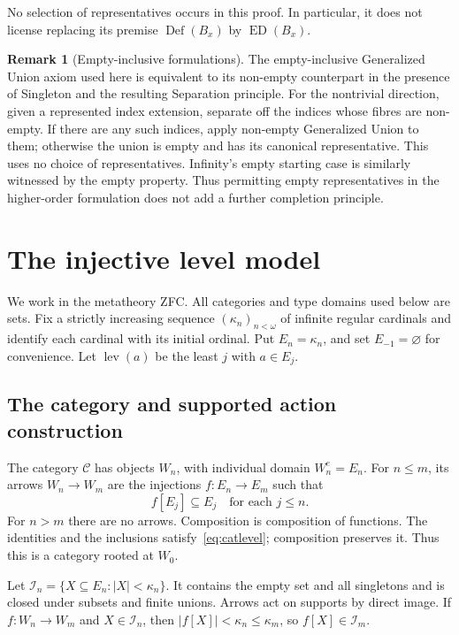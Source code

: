 \documentclass[11pt]{article}
\theoremstyle{definition}
\newtheorem{remark}[theorem]{Remark}
\newcommand{\ED}{\operatorname{ED}}
\newcommand{\Def}{\operatorname{Def}}
\newcommand{\lev}{\operatorname{lev}}
\numberwithin{equation}{section}
\begin{document}
No selection of representatives occurs in this proof. In particular, it does not license replacing its premise $\Def(B_x)$ by $\ED(B_x)$.

\begin{remark}[Empty-inclusive formulations]
The empty-inclusive Generalized Union axiom used here is equivalent to its non-empty counterpart in the presence of Singleton and the resulting Separation principle. For the nontrivial direction, given a represented index extension, separate off the indices whose fibres are non-empty. If there are any such indices, apply non-empty Generalized Union to them; otherwise the union is empty and has its canonical representative. This uses no choice of representatives. Infinity's empty starting case is similarly witnessed by the empty property. Thus permitting empty representatives in the higher-order formulation does not add a further completion principle.
\end{remark}

\section{The injective level model}\label{app:model}

We work in the metatheory ZFC. All categories and type domains used below are sets. Fix a strictly increasing sequence $(\kappa_n)_{n<\omega}$ of infinite regular cardinals and identify each cardinal with its initial ordinal. Put $E_n=\kappa_n$, and set $E_{-1}=\varnothing$ for convenience. Let $\lev(a)$ be the least $j$ with $a\in E_j$.

\subsection{The category and supported action construction}

The category $\mathcal C$ has objects $W_n$, with individual domain $W_n^e=E_n$. For $n\le m$, its arrows $W_n\to W_m$ are the injections $f:E_n\to E_m$ such that
\begin{equation}\label{eq:catlevel}
f[E_j]\subseteq E_j\quad\text{for each }j\le n.
\end{equation}
For $n>m$ there are no arrows. Composition is composition of functions. The identities and the inclusions satisfy~\eqref{eq:catlevel}; composition preserves it. Thus this is a category rooted at $W_0$.

Let $\mathcal I_n=\{X\subseteq E_n:|X|<\kappa_n\}$. It contains the empty set and all singletons and is closed under subsets and finite unions. Arrows act on supports by direct image. If $f:W_n\to W_m$ and $X\in\mathcal I_n$, then $|f[X]|<\kappa_n\le\kappa_m$, so $f[X]\in\mathcal I_m$.
\end{document}
